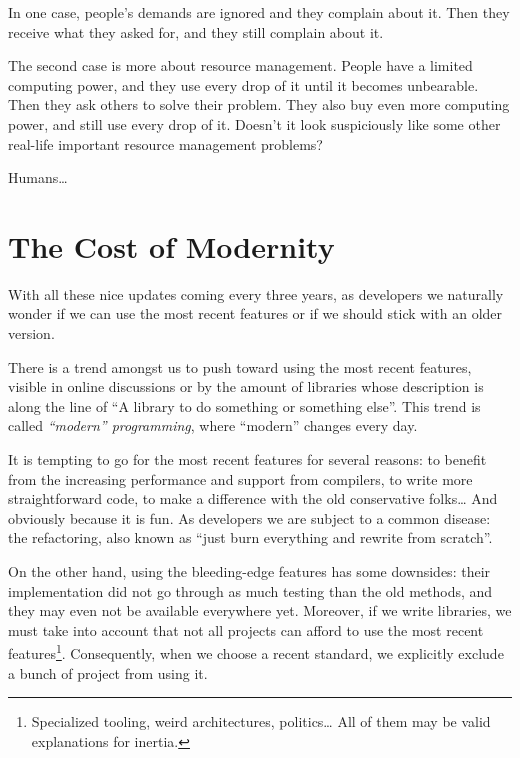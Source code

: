 \bigskip

In one case, people's demands are ignored and they complain about
it. Then they receive what they asked for, and they still complain
about it.

The second case is more about resource management. People have a
limited computing power, and they use every drop of it until it
becomes unbearable. Then they ask others to solve their problem. They
also buy even more computing power, and still use every drop of
it. Doesn't it look suspiciously like some other real-life important
resource management problems?

\bigskip

Humans…

\section{The Cost of Modernity}

With all these nice updates coming every three years, as \cpp{}
developers we naturally wonder if we can use the most recent features
or if we should stick with an older version.

There is a trend amongst us to push toward using the most recent
features, visible in online discussions or by the amount of libraries
whose description is along the line of ``A  library to do
something or something else''. This trend is called \emph{``modern''
  \cpp{} programming}, where ``modern'' changes every day.

It is tempting to go for the most recent features for several reasons:
to benefit from the increasing performance and support from compilers,
to write more straightforward code, to make a difference with the old
conservative folks… And obviously because it is fun. As developers we
are subject to a common disease: the refactoring, also known as ``just
burn everything and rewrite from scratch''.

On the other hand, using the bleeding-edge features has some
downsides: their implementation did not go through as much testing
than the old methods, and they may even not be available everywhere
yet. Moreover, if we write libraries, we must take into account that
not all projects can afford to use the most recent
features\footnote{Specialized tooling, weird architectures, politics…
  All of them may be valid explanations for inertia.}. Consequently,
when we choose a recent standard, we explicitly exclude a bunch of
project from using it.

